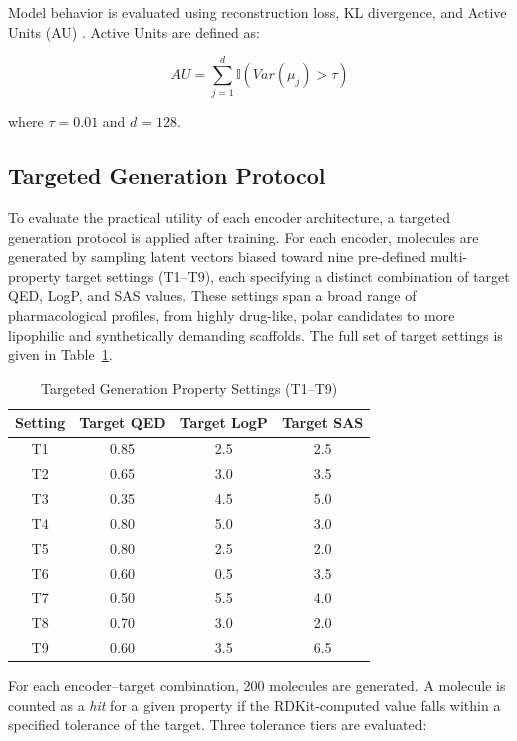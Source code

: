 \documentclass[conference]{IEEEtran}
\begin{document}
Model behavior is evaluated using reconstruction loss, KL divergence, and Active Units (AU) \cite{active_units_citation}. Active Units are defined as:

\begin{equation}
AU = \sum_{j=1}^{d}\mathbb{I}\left(Var(\mu_{j}) > \tau\right)
\end{equation}

where $\tau = 0.01$ and $d = 128$.

\subsection{Targeted Generation Protocol}

To evaluate the practical utility of each encoder architecture, a targeted generation protocol is applied after training. For each encoder, molecules are generated by sampling latent vectors biased toward nine pre-defined multi-property target settings (T1--T9), each specifying a distinct combination of target QED, LogP, and SAS values. These settings span a broad range of pharmacological profiles, from highly drug-like, polar candidates to more lipophilic and synthetically demanding scaffolds. The full set of target settings is given in Table~\ref{tab:target_settings}.

\begin{table}[h]
\centering
\caption{Targeted Generation Property Settings (T1--T9)}
\label{tab:target_settings}
\begin{tabular}{@{}cccc@{}}
\toprule
\textbf{Setting} & \textbf{Target QED} & \textbf{Target LogP} & \textbf{Target SAS} \\
\midrule
T1 & 0.85 & 2.5 & 2.5 \\
T2 & 0.65 & 3.0 & 3.5 \\
T3 & 0.35 & 4.5 & 5.0 \\
T4 & 0.80 & 5.0 & 3.0 \\
T5 & 0.80 & 2.5 & 2.0 \\
T6 & 0.60 & 0.5 & 3.5 \\
T7 & 0.50 & 5.5 & 4.0 \\
T8 & 0.70 & 3.0 & 2.0 \\
T9 & 0.60 & 3.5 & 6.5 \\
\bottomrule
\end{tabular}
\end{table}

For each encoder--target combination, 200 molecules are generated. A molecule is counted as a \textit{hit} for a given property if the RDKit-computed value falls within a specified tolerance of the target. Three tolerance tiers are evaluated:
\end{document}
